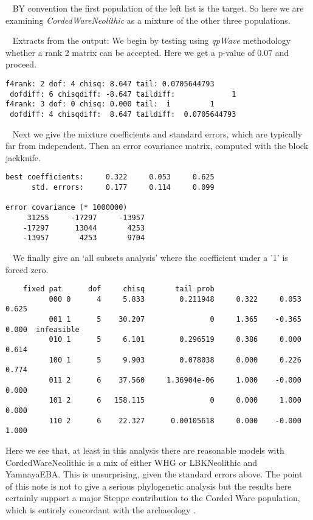 \documentclass{article} %
\newcommand  {\nld }  {{\ \newline \noindent}}
\newcommand  {\qpw }  {{\em qpWave }}
\begin{document}
\nld
BY convention the first population of the left list is the target. 
So here we are examining {\em CordedWareNeolithic} as a mixture of the 
other three populations.

\nld
Extracts from the output:
We begin by testing using \qpw methodology whether a rank 2 matrix can be accepted.  Here we get a p-value of $0.07$ 
and proceed. 
\begin{verbatim}
f4rank: 2 dof: 4 chisq: 8.647 tail: 0.0705644793 
 dofdiff: 6 chisqdiff: -8.647 taildiff:             1 
f4rank: 3 dof: 0 chisq: 0.000 tail:  i         1 
 dofdiff: 4 chisqdiff:  8.647 taildiff:  0.0705644793 
\end{verbatim}

\nld
Next we give the mixture coefficients and standard errors, which are typically far from independent.
Then an error covariance matrix, computed with the block jackknife.
\begin{verbatim}
best coefficients:     0.322     0.053     0.625
      std. errors:     0.177     0.114     0.099

error covariance (* 1000000)
     31255     -17297     -13957
    -17297      13044       4253
    -13957       4253       9704
\end{verbatim} 

\nld
We finally give an `all subsets analysis' where the coefficient under a '1' is forced
zero.
\begin{verbatim}
    fixed pat      dof     chisq       tail prob
          000 0      4     5.833        0.211948     0.322     0.053     0.625
          001 1      5    30.207               0     1.365    -0.365     0.000  infeasible
          010 1      5     6.101        0.296519     0.386     0.000     0.614
          100 1      5     9.903        0.078038     0.000     0.226     0.774
          011 2      6    37.560     1.36904e-06     1.000    -0.000     0.000
          101 2      6   158.115               0     0.000     1.000     0.000
          110 2      6    22.327      0.00105618     0.000    -0.000     1.000
\end{verbatim}
Here we see that, at least in this analysis there are reasonable models with CordedWareNeolithic
is a mix of either WHG or LBKNeolithic and YamnayaEBA.  
This is unsurprising, given the standard errors above.  
The point of this note is not to give a serious phylogenetic analysis but the results here certainly support 
a major Steppe contribution to the Corded Ware population, 
which is entirely concordant with the archaeology \cite{anthony}. 


\end{document}
